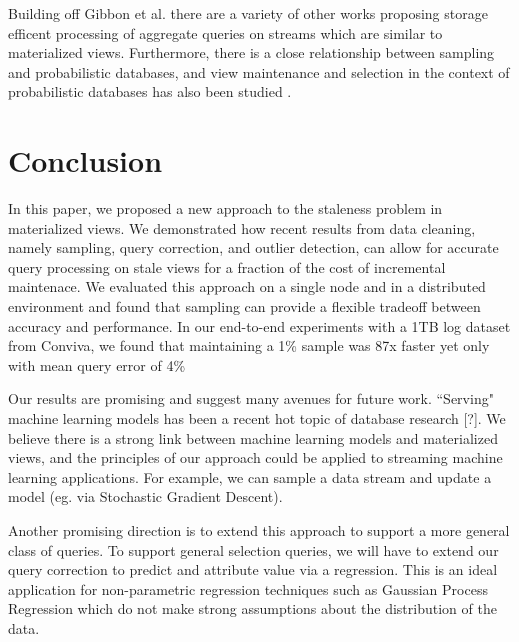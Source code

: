 Building off Gibbon et al. there are a variety of other works proposing storage efficent processing of aggregate queries on streams \cite{dobra2002processing, greenwald2001space} which are similar to materialized views. Furthermore, there is a close relationship between sampling and probabilistic databases, and view maintenance and selection in the context of probabilistic databases has also been studied \cite{re2007materialized}.

\section{Conclusion}
In this paper, we proposed a new approach to the staleness problem in materialized views.
We demonstrated how recent results from data cleaning, namely sampling, query correction, and outlier detection, can
allow for accurate query processing on stale views for a fraction of the cost of incremental maintenace.
We evaluated this approach on a single node and in a distributed environment and found that sampling can provide a flexible tradeoff 
between accuracy and performance.
In our end-to-end experiments with a 1TB log dataset from Conviva, we found that maintaining a 1\% sample was 87x faster yet only with mean query error of 4\%

Our results are promising and suggest many avenues for future work.
``Serving" machine learning models has been a recent hot topic of database research [?].
We believe there is a strong link between machine learning models and materialized views, and the principles of our approach could be applied
to streaming machine learning applications.
For example, we can sample a data stream and update a model (eg. via Stochastic Gradient Descent).

Another promising direction is to extend this approach to support a more general class of queries.
To support general selection queries, we will have to extend our query correction to predict and attribute value via a regression.
This is an ideal application for non-parametric regression techniques such as Gaussian Process Regression which do
not make strong assumptions about the distribution of the data.


